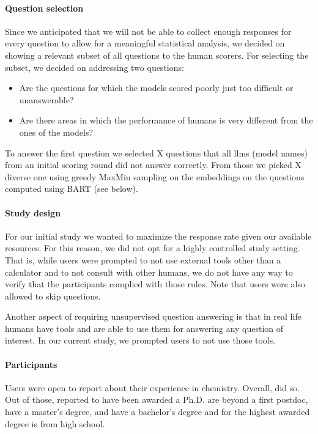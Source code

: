 \documentclass[11pt, oneside]{article}
\begin{document}
\paragraph{Question selection} \label{sec:subset-selection}
Since we anticipated that we will not be able to collect enough responses for every question to allow for a meaningful statistical analysis, we decided on showing a relevant subset of all questions to the human scorers.
For selecting the subset, we decided on addressing two questions:
\begin{itemize}
    \item Are the questions for which the models scored poorly just too difficult or unanswerable?
    \item Are there areas in which the performance of humans is very different from the ones of the models?
\end{itemize}
To answer the first question we selected X questions that all \glspl{llm} (model names) from an initial scoring round did not answer correctly.
From those we picked X diverse one using greedy MaxMin sampling on the embeddings on the questions computed using BART (see below).


\paragraph{Study design}
For our initial study we wanted to maximize the response rate given our available resources. 
For this reason, we did not opt for a highly controlled study setting. 
That is, while users were prompted to not use external tools other than a calculator and to not consult with other humans, we do not have any way to verify that the participants complied with those rules. 
Note that users were also allowed to skip questions.

Another aspect of requiring unsupervised question answering is that in real life humans have tools and are able to use them for answering any question of interest. 
In our current study, we prompted users to not use those tools.

\paragraph{Participants}
Users were open to report about their experience in chemistry. 
Overall,  did so. 
Out of those,  reported to have been awarded a Ph.D.
 are beyond a first postdoc,  have a master's degree, and  have a bachelor's degree and for  the highest awarded degree is from high school.
\end{document}

